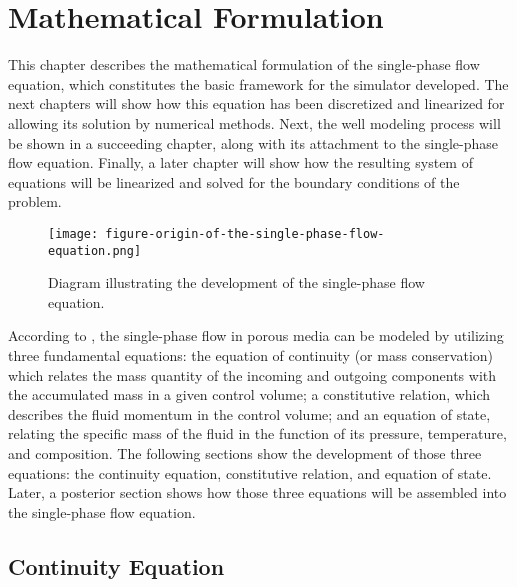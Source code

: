 \chapter{Mathematical Formulation}
\label{chapter-mathematical-formulation}
 
This chapter describes the mathematical formulation of the single-phase flow equation, which constitutes the basic framework for the simulator developed. 
%
The next chapters will show how this equation has been discretized and linearized for allowing its solution by numerical methods.
%
Next, the well modeling process will be shown in a succeeding chapter, along with its attachment to the single-phase flow equation.
%
Finally, a later chapter will show how the resulting system of equations will be linearized and solved for the boundary conditions of the problem.
\begin{figure}[H]
 	\centering
 	\texttt{[image: figure-origin-of-the-single-phase-flow-equation.png]}\\
 	\caption{Diagram illustrating the development of the single-phase flow equation.}
 	\label{figure-origin-of-the-single-phase-flow-equation}
\end{figure}

According to \cite{Ertekin2001}, the single-phase flow in porous media can be modeled by utilizing three fundamental equations: the equation of continuity (or mass conservation) which relates the mass quantity of the incoming and outgoing components with the accumulated mass in a given control volume; a constitutive relation, which describes the fluid momentum in the control volume; and an equation of state, relating the specific mass of the fluid in the function of its pressure, temperature, and composition.
%
The following sections show the development of those three equations: the continuity equation, constitutive relation, and equation of state. Later, a posterior section shows how those three equations will be assembled into the single-phase flow equation.
  
\section{Continuity Equation}

